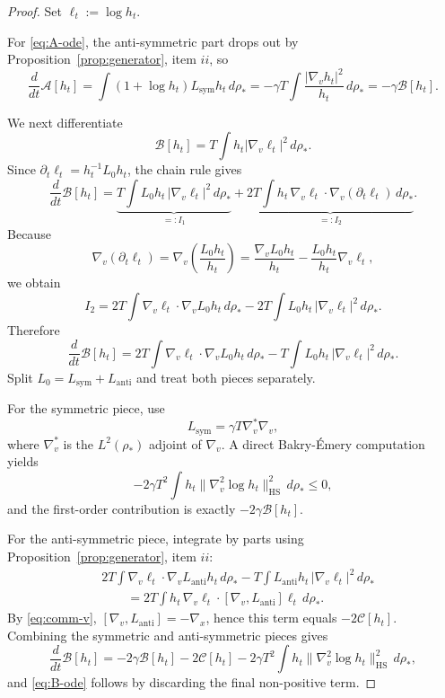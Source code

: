 \documentclass[11pt]{article}
\theoremstyle{definition}
\theoremstyle{remark}
\begin{document}
\begin{proof}
Set $\ell_t:=\log h_t$.

For \eqref{eq:A-ode}, the anti-symmetric part drops out by
Proposition~\ref{prop:generator}, item $ii$, so
\[
\frac{d}{dt}\mathcal A[h_t]
=
\int (1+\log h_t)L_{\mathrm{sym}}h_t\,d\rho_*
=
-\gamma T\int \frac{|\nabla_v h_t|^2}{h_t}\,d\rho_*
=
-\gamma \mathcal B[h_t].
\]

We next differentiate
\[
\mathcal B[h_t]=T\int h_t |\nabla_v\ell_t|^2\,d\rho_*.
\]
Since $\partial_t \ell_t=h_t^{-1}L_0 h_t$, the chain rule gives
\[
\frac{d}{dt}\mathcal B[h_t]
=
\underbrace{T\int L_0 h_t\,|\nabla_v\ell_t|^2\,d\rho_*}_{=:I_1}
+\underbrace{2T\int h_t \,\nabla_v\ell_t\cdot \nabla_v(\partial_t \ell_t)\,d\rho_*}_{=:I_2}.
\]
Because
\[
\nabla_v(\partial_t \ell_t)
=
\nabla_v\!\left(\frac{L_0 h_t}{h_t}\right)
=
\frac{\nabla_v L_0 h_t}{h_t}
-\frac{L_0 h_t}{h_t}\nabla_v\ell_t,
\]
we obtain
\[
I_2
=
2T\int \nabla_v\ell_t\cdot \nabla_vL_0 h_t\,d\rho_*
-2T\int L_0 h_t\,|\nabla_v\ell_t|^2\,d\rho_*.
\]
Therefore
\[
\frac{d}{dt}\mathcal B[h_t]
=
2T\int \nabla_v\ell_t\cdot \nabla_vL_0 h_t\,d\rho_*
-T\int L_0 h_t\,|\nabla_v\ell_t|^2\,d\rho_*.
\]
Split $L_0=L_{\mathrm{sym}}+L_{\mathrm{anti}}$ and treat both pieces
separately.

For the symmetric piece, use
\[
L_{\mathrm{sym}}=\gamma T\nabla_v^*\nabla_v,
\]
where $\nabla_v^*$ is the $L^2(\rho_*)$ adjoint of $\nabla_v$. A direct
Bakry-\'Emery computation yields
\[
-2\gamma T^2\int h_t\|\nabla_v^2\log h_t\|_{\mathrm{HS}}^2\,d\rho_*\leq0,
\]
and the first-order contribution is exactly $-2\gamma \mathcal B[h_t]$.

For the anti-symmetric piece, integrate by parts using
Proposition~\ref{prop:generator}, item $ii$:
\begin{align*}
&2T\int \nabla_v\ell_t\cdot \nabla_vL_{\mathrm{anti}}h_t\,d\rho_*
-T\int L_{\mathrm{anti}} h_t\,|\nabla_v\ell_t|^2\,d\rho_*\\
&\qquad=
2T\int h_t \,\nabla_v\ell_t\cdot [\nabla_v,L_{\mathrm{anti}}]\ell_t\,d\rho_*.
\end{align*}
By \eqref{eq:comm-v}, $[\nabla_v,L_{\mathrm{anti}}]=-\nabla_x$, hence this term
equals $-2\mathcal C[h_t]$. Combining the symmetric and anti-symmetric pieces
gives
\[
\frac{d}{dt}\mathcal B[h_t]
=
-2\gamma \mathcal B[h_t]
-2\mathcal C[h_t]
-2\gamma T^2\int h_t\|\nabla_v^2\log h_t\|_{\mathrm{HS}}^2\,d\rho_*,
\]
and \eqref{eq:B-ode} follows by discarding the final non-positive term.


\end{proof}
\end{document}
